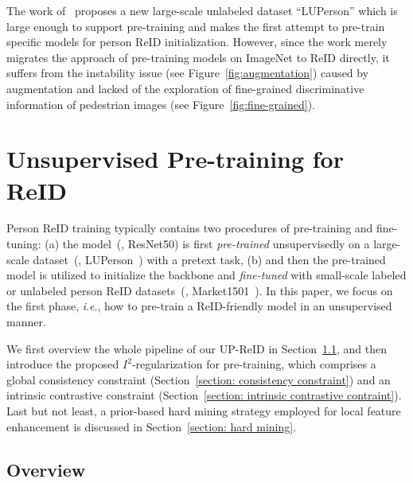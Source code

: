 \documentclass[10pt,twocolumn,letterpaper]{article}
\newcommand{\ieno}{\textit{i}.\textit{e}.}
\begin{document}
The work of~\cite{fu2021unsupervised} proposes a new large-scale unlabeled dataset ``LUPerson'' which is large enough to support pre-training and makes the first attempt to pre-train specific models for person ReID initialization. However, since the work merely migrates the approach of pre-training models on ImageNet to ReID directly, it suffers from the instability issue (see Figure~\ref{fig:augmentation}) caused by augmentation and lacked of the exploration of fine-grained discriminative information of pedestrian images (see Figure~\ref{fig:fine-grained}). 



\section{Unsupervised Pre-training for ReID}


Person ReID training typically contains two procedures of pre-training and fine-tuning: (a) the model~(\eg, ResNet50) is first \emph{pre-trained} unsupervisedly on a large-scale dataset~(\eg, LUPerson~\cite{fu2021unsupervised}) with a pretext task, (b) and then the pre-trained model is utilized to initialize the backbone and \emph{fine-tuned} with small-scale labeled or unlabeled person ReID datasets~(\eg, Market1501~\cite{zheng2015scalable}). In this paper, we focus on the first phase, \ieno, how to pre-train a ReID-friendly model in an unsupervised manner.


We first overview the whole pipeline of our UP-ReID in Section~\ref{section: overview}, and then introduce the proposed \emph{$I^2$}-regularization for pre-training, which comprises a global consistency constraint (Section~\ref{section: consistency constraint}) and an intrinsic contrastive constraint (Section~\ref{section: intrinsic contrastive contraint}). Last but not least, a prior-based hard mining strategy employed for local feature enhancement is discussed in Section~\ref{section: hard mining}.

\subsection{Overview}
\label{section: overview}
\end{document}
